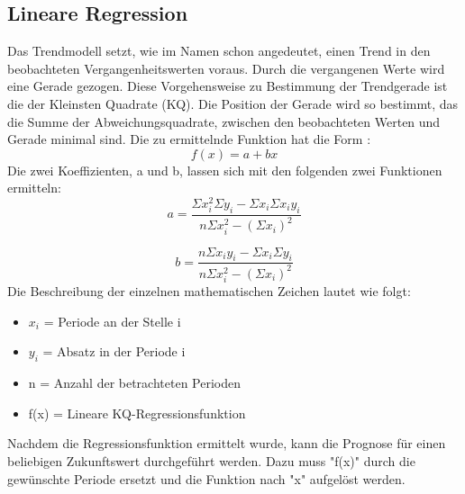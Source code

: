\subsection{Lineare Regression}
Das Trendmodell setzt, wie im Namen schon angedeutet, einen Trend in den beobachteten Vergangenheitswerten voraus. Durch die vergangenen Werte wird eine Gerade gezogen. Diese Vorgehensweise zu Bestimmung der Trendgerade ist die der Kleinsten Quadrate (KQ).
Die Position der Gerade wird so bestimmt, das die Summe der Abweichungsquadrate, zwischen den beobachteten Werten und Gerade minimal sind. Die zu ermittelnde Funktion hat die Form \cite{schwarze2009}:
\begin{equation}
	f(x) = a + bx
\end{equation}
Die zwei Koeffizienten, a und b, lassen sich mit den folgenden zwei Funktionen ermitteln:
\begin{equation}
	a = \dfrac{\Sigma x^{2}_{i} \Sigma y_{i} - \Sigma x_{i} \Sigma x_{i}y_{i}}{n \Sigma x^{2}_{i} - (\Sigma x_{i})^{2}}
\end{equation}

\begin{equation}
	b = \dfrac{n\Sigma x_{i}y_{i} - \Sigma x_{i} \Sigma y_{i}}{n \Sigma x^{2}_{i} - (\Sigma x_{i})^{2}}
\end{equation}
Die Beschreibung der einzelnen mathematischen Zeichen lautet wie folgt:
\begin{itemize}
	\item \(x_{i}\) = Periode an der Stelle i
	\item \(y_{i}\) = Absatz in der Periode i
	\item n = Anzahl der betrachteten Perioden
	\item f(x) = Lineare KQ-Regressionsfunktion
\end{itemize}
Nachdem die Regressionsfunktion ermittelt wurde, kann die Prognose für einen beliebigen Zukunftswert durchgeführt werden. Dazu muss "f(x)" durch die gewünschte Periode ersetzt und die Funktion nach "x" aufgelöst werden.

